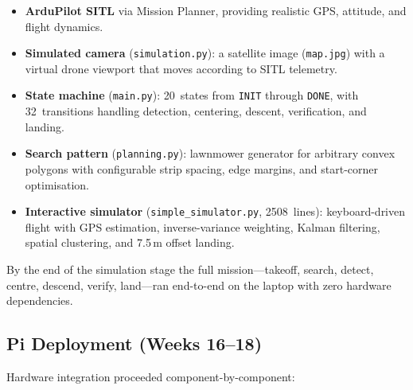 \begin{itemize}[leftmargin=1.5em]
  \item \textbf{ArduPilot SITL} via Mission Planner, providing
        realistic GPS, attitude, and flight dynamics.
  \item \textbf{Simulated camera} (\texttt{simulation.py}): a
        satellite image (\texttt{map.jpg}) with a virtual drone viewport
        that moves according to SITL telemetry.
  \item \textbf{State machine} (\texttt{main.py}): 20~states from
        \texttt{INIT} through \texttt{DONE}, with 32~transitions
        handling detection, centering, descent, verification, and
        landing.
  \item \textbf{Search pattern} (\texttt{planning.py}): lawnmower
        generator for arbitrary convex polygons with configurable
        strip spacing, edge margins, and start-corner optimisation.
  \item \textbf{Interactive simulator}
        (\texttt{simple\_simulator.py}, 2508~lines): keyboard-driven
        flight with GPS estimation, inverse-variance weighting, Kalman
        filtering, spatial clustering, and 7.5\,m offset landing.
\end{itemize}

By the end of the simulation stage the full mission---takeoff, search,
detect, centre, descend, verify, land---ran end-to-end on the laptop
with zero hardware dependencies.

\subsection{Pi Deployment (Weeks 16--18)}\label{sec:pi-deploy}

Hardware integration proceeded component-by-component:

